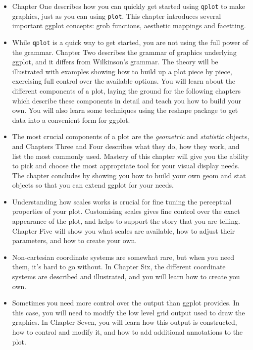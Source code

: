 \documentclass[oneside,letterpaper]{scrartcl}
\begin{document}
\begin{itemize}
  \item Chapter One describes how you can quickly get started using {\tt qplot} to make graphics, just as you can using {\tt plot}.  This chapter introduces several important ggplot concepts: grob functions, aesthetic mappings and facetting.
  
  \item While {\tt qplot} is a quick way to get started, you are not using the full power of the grammar.  Chapter Two describes the grammar of graphics underlying ggplot, and it differs from Wilkinson's grammar.  The theory will be illustrated with examples showing how to build up a plot piece by piece, exercising full control over the available options.  You will learn about the different components of a plot, laying the ground for the following chapters which describe these components in detail and teach you how to build your own.  You will also learn some techniques using the reshape package to get data into a convenient form for ggplot.

  \item The most crucial components of a plot are the {\em geometric} and {\em statistic} objects, and Chapters Three and Four describes what they do, how they work, and list the most commonly used.  Mastery of this chapter will give you the ability to pick and choose the most appropriate tool for your visual display needs.  The chapter concludes by showing you how to build your own geom and stat objects so that you can extend ggplot for your needs.

  \item Understanding how scales works is crucial for fine tuning the perceptual properties of your plot.  Customising scales gives fine control over the exact appearance of the plot, and helps to support the story that you are telling.  Chapter Five will show you what scales are available, how to adjust their parameters, and how to create your own.

  \item Non-cartesian coordinate systems are somewhat rare, but when you need them, it's hard to go without.  In Chapter Six, the different coordinate systems are described and illustrated, and you will learn how to create you own.
  
  \item Sometimes you need more control over the output than ggplot provides.  In this case, you will need to modify the low level grid output used to draw the graphics.  In Chapter Seven, you will learn how this output is constructed, how to control and modify it, and how to add additional annotations to the plot.

\end{itemize}
\end{document}
